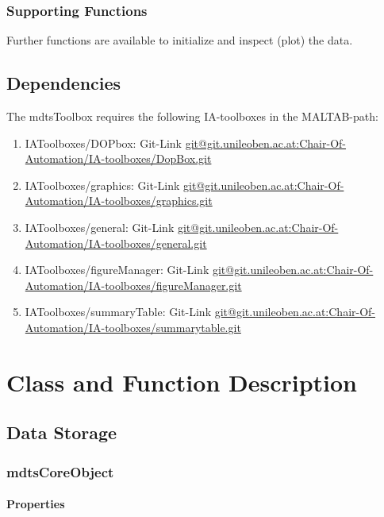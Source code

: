 \documentclass[a4]{scrreprt}
\begin{document}
\subsection{Supporting Functions}

Further functions are available to initialize and inspect (plot) the data.

\section{Dependencies}

The mdtsToolbox requires the following IA-toolboxes in the MALTAB-path:

\begin{enumerate}
	\item IAToolboxes/DOPbox: Git-Link \url{git@git.unileoben.ac.at:Chair-Of-Automation/IA-toolboxes/DopBox.git}
	\item IAToolboxes/graphics: Git-Link \url{git@git.unileoben.ac.at:Chair-Of-Automation/IA-toolboxes/graphics.git}
	\item IAToolboxes/general: Git-Link \url{git@git.unileoben.ac.at:Chair-Of-Automation/IA-toolboxes/general.git}
	\item IAToolboxes/figureManager: Git-Link \url{git@git.unileoben.ac.at:Chair-Of-Automation/IA-toolboxes/figureManager.git}
	\item IAToolboxes/summaryTable: Git-Link \url{git@git.unileoben.ac.at:Chair-Of-Automation/IA-toolboxes/summarytable.git}
\end{enumerate}

\chapter{Class and Function Description}

\section{Data Storage}

\subsection{mdtsCoreObject}
\label{ChpDescriptionMdtsCoreObject}

\subsubsection{Properties}
\end{document}
